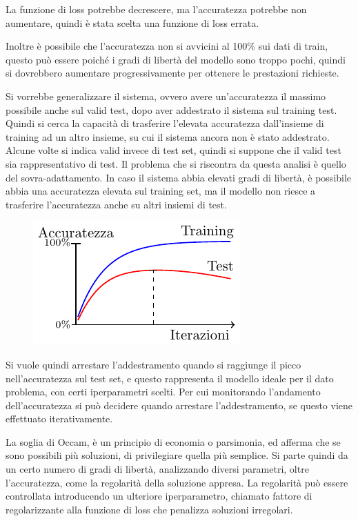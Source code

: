 \documentclass{article}
\numberwithin{equation}{subsection}
\begin{document}
La funzione di loss potrebbe decrescere, ma l'accuratezza potrebbe non aumentare, quindi è stata scelta una funzione di loss errata. 

Inoltre è possibile che l'accuratezza non si avvicini al 100\% sui dati di train, questo può essere poiché i gradi di libertà del modello sono troppo pochi, quindi si dovrebbero aumentare progressivamente per ottenere le prestazioni richieste. 


Si vorrebbe generalizzare il sistema, ovvero avere un'accuratezza il massimo possibile 
anche sul valid test, dopo aver addestrato il sistema sul training test. Quindi si cerca la capacità di trasferire l'elevata accuratezza dall'insieme di training ad un altro insieme, su cui il sistema ancora non è stato addestrato. 
Alcune volte si indica valid invece di test set, quindi si suppone che il valid test sia 
rappresentativo di test. Il problema che si riscontra da questa analisi è quello del sovra-adattamento. In caso il sistema abbia elevati gradi di libertà, è possibile abbia una accuratezza elevata sul training set, ma il modello non riesce a trasferire l'accuratezza anche su altri insiemi di test. 

\begin{figure}[H]%
    \centering%
    \includegraphics{overfitting.pdf}%
\end{figure}

Si vuole quindi arrestare l'addestramento quando si raggiunge il picco nell'accuratezza sul test set, e questo rappresenta il modello ideale per il dato problema, con certi iperparametri scelti. Per cui monitorando l'andamento dell'accuratezza si può decidere quando arrestare l'addestramento, se questo viene effettuato iterativamente. 

La soglia di Occam, è un principio di economia o parsimonia, ed afferma che se sono possibili più soluzioni, di privilegiare quella più semplice. 
Si parte quindi da un certo numero di gradi di libertà, analizzando diversi parametri, oltre l'accuratezza, come la regolarità della soluzione appresa. La regolarità può essere controllata introducendo un ulteriore iperparametro, chiamato fattore di regolarizzante alla 
funzione di loss che penalizza soluzioni irregolari. 
\end{document}
